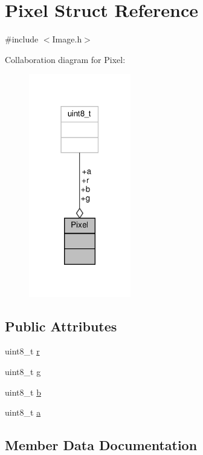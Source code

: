 \hypertarget{structPixel}{}\section{Pixel Struct Reference}
\label{structPixel}


{\ttfamily \#include $<$Image.\+h$>$}



Collaboration diagram for Pixel\+:\nopagebreak
\begin{figure}[H]
\begin{center}
\leavevmode
\includegraphics[width=126pt]{structPixel__coll__graph}
\end{center}
\end{figure}
\subsection*{Public Attributes}
\begin{DoxyCompactItemize}
\item 
uint8\+\_\+t \hyperlink{structPixel_a47d65d4a410f57c46746ddedd709e177}{r}
\item 
uint8\+\_\+t \hyperlink{structPixel_aeab078b7768caf273f8fe1daffa50729}{g}
\item 
uint8\+\_\+t \hyperlink{structPixel_abc9f592730eddbfcb270a1974a498d78}{b}
\item 
uint8\+\_\+t \hyperlink{structPixel_ad5c63be985fc9e1d1089907a89d7671c}{a}
\end{DoxyCompactItemize}


\subsection{Member Data Documentation}
\mbox{\label{structPixel_ad5c63be985fc9e1d1089907a89d7671c}} 
